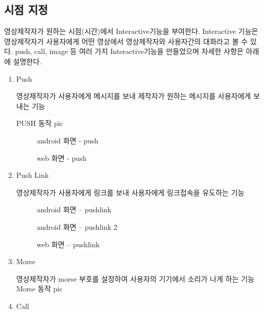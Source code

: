 \documentclass{oblivoir}
\begin{document}
\subsection{시점 지정}

영상제작자가 원하는 시점(시간)에서 Interactive기능을 부여한다. Interactive 기능은 영상제작자가 사용자에게 어떤 영상에서 영상제작자와 사용자간의 대화라고 볼 수 있다. push, call, image 등 여러 가지 Interactive기능을 만들었으며 자세한 사항은 아래에 설명한다.  

\begin{enumerate}

    \item  Push 

    영상제작자가 사용자에게 메시지를 보내 제작자가 원하는 메시지를 사용자에게 보내는 기능

    PUSH 동작 pic

    \begin{figure}[h!]
    \centering
    \caption{android 화면 - push}
    \end{figure}
    \begin{figure}[h!]
    \centering
    \caption{web 화면 - push}
    \end{figure}

    \item  Push Link 

    영상제작자가 사용자에게 링크를 보내 사용자에게 링크접속을 유도하는 기능

    \begin{figure}[h!]
    \centering
    \caption{android 화면 – pushlink}
    \end{figure}

    \begin{figure}[h!]
    \centering
    \caption{android 화면 – pushlink 2}
    \end{figure}

    \begin{figure}[h!]
    \centering
    \caption{web 화면 – pushlink}
    \end{figure}

    \item  Morse

    영상제작자가 morse 부호를 설정하여 사용자의 기기에서 소리가 나게 하는 기능
    Morse 동작 pic

    \item  Call 


\end{enumerate}
\end{document}
